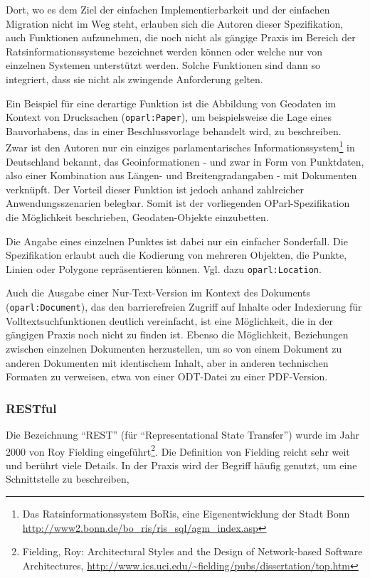 \documentclass[,a4paper]{article}
\begin{document}
Dort, wo es dem Ziel der einfachen Implementierbarkeit und der einfachen
Migration nicht im Weg steht, erlauben sich die Autoren dieser
Spezifikation, auch Funktionen aufzunehmen, die noch nicht als gängige
Praxis im Bereich der Ratsinformationssysteme bezeichnet werden können
oder welche nur von einzelnen Systemen unterstützt werden. Solche
Funktionen sind dann so integriert, dass sie nicht als zwingende
Anforderung gelten.

Ein Beispiel für eine derartige Funktion ist die Abbildung von Geodaten
im Kontext von Drucksachen (\texttt{oparl:Paper}), um beispielsweise die
Lage eines Bauvorhabens, das in einer Beschlussvorlage behandelt wird,
zu beschreiben. Zwar ist den Autoren nur ein einziges parlamentarisches
Informationssystem\footnote{Das Ratsinformationssystem BoRis, eine
  Eigenentwicklung der Stadt Bonn
  \url{http://www2.bonn.de/bo_ris/ris_sql/agm_index.asp}} in Deutschland
bekannt, das Geoinformationen - und zwar in Form von Punktdaten, also
einer Kombination aus Längen- und Breitengradangaben - mit Dokumenten
verknüpft. Der Vorteil dieser Funktion ist jedoch anhand zahlreicher
Anwendungsszenarien belegbar. Somit ist der vorliegenden
OParl-Spezifikation die Möglichkeit beschrieben, Geodaten-Objekte
einzubetten.

Die Angabe eines einzelnen Punktes ist dabei nur ein einfacher
Sonderfall. Die Spezifikation erlaubt auch die Kodierung von mehreren
Objekten, die Punkte, Linien oder Polygone repräsentieren können. Vgl.
dazu \texttt{oparl:Location}.

Auch die Ausgabe einer Nur-Text-Version im Kontext des Dokuments
(\texttt{oparl:Document}), das den barrierefreien Zugriff auf Inhalte
oder Indexierung für Volltextsuchfunktionen deutlich vereinfacht, ist
eine Möglichkeit, die in der gängigen Praxis noch nicht zu finden ist.
Ebenso die Möglichkeit, Beziehungen zwischen einzelnen Dokumenten
herzustellen, um so von einem Dokument zu anderen Dokumenten mit
identischem Inhalt, aber in anderen technischen Formaten zu verweisen,
etwa von einer ODT-Datei zu einer PDF-Version.

\subsubsection{RESTful}\label{restful}

Die Bezeichnung ``REST'' (für ``Representational State Transfer'') wurde
im Jahr 2000 von Roy Fielding eingeführt\footnote{Fielding, Roy:
  Architectural Styles and the Design of Network-based Software
  Architectures,
  \url{http://www.ics.uci.edu/~fielding/pubs/dissertation/top.htm}}. Die
Definition von Fielding reicht sehr weit und berührt viele Details. In
der Praxis wird der Begriff häufig genutzt, um eine Schnittstelle zu
beschreiben,
\end{document}
